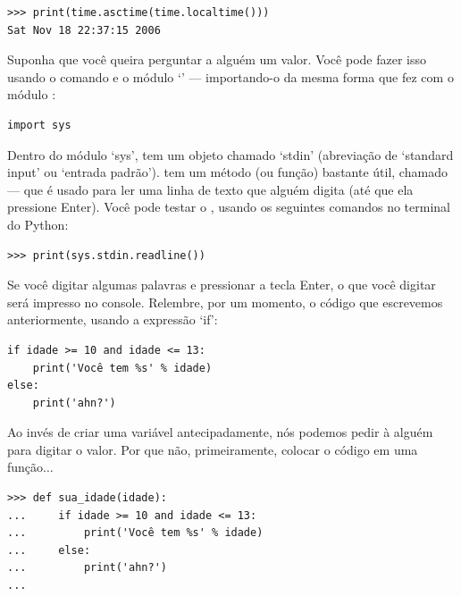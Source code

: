 \begin{listingignore}
\begin{verbatim}
>>> print(time.asctime(time.localtime()))
Sat Nov 18 22:37:15 2006
\end{verbatim}
\end{listingignore}

Suponha que você queira perguntar a alguém um valor. Você pode fazer isso usando o comando  e o módulo `' --- importando-o da mesma forma que fez com o módulo :

\begin{listing}
\begin{verbatim}
import sys
\end{verbatim}
\end{listing}

Dentro do módulo `sys', tem um objeto chamado `stdin' (abreviação de `standard input' ou `entrada padrão').  tem um método (ou função) bastante útil, chamado  --- que é usado para ler uma linha de texto que alguém digita (até que ela pressione Enter). Você pode testar o , usando os seguintes comandos no terminal do Python:

\begin{listing}
\begin{verbatim}
>>> print(sys.stdin.readline())
\end{verbatim}
\end{listing}

Se você digitar algumas palavras e pressionar a tecla Enter, o que você digitar será impresso no console. Relembre, por um momento, o código que escrevemos anteriormente, usando a expressão `if':

\begin{listing}
\begin{verbatim}
if idade >= 10 and idade <= 13:
    print('Você tem %s' % idade)
else:
    print('ahn?')
\end{verbatim}
\end{listing}

Ao invés de criar uma variável  antecipadamente, nós podemos pedir à alguém para digitar o valor. Por que não, primeiramente, colocar o código em uma função$\ldots$

\begin{listing}
\begin{verbatim}
>>> def sua_idade(idade):
...     if idade >= 10 and idade <= 13:
...         print('Você tem %s' % idade)
...     else:
...         print('ahn?')
... 
\end{verbatim}
\end{listing}

